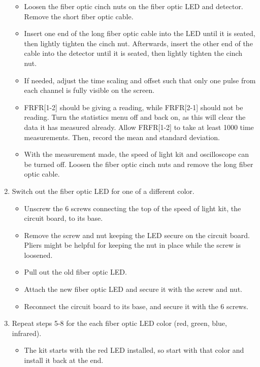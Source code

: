 \documentclass[12pt]{iopart} %
\begin{document}
\begin{enumerate}
  \begin{itemize}
  \item
    Loosen the fiber optic cinch nuts on the fiber optic LED and
    detector. Remove the short fiber optic cable.
  \item
    Insert one end of the long fiber optic cable into the LED until it
    is seated, then lightly tighten the cinch nut. Afterwards, insert
    the other end of the cable into the detector until it is seated,
    then lightly tighten the cinch nut.
  \item
    If needed, adjust the time scaling and offset such that only one
    pulse from each channel is fully visible on the screen.
  \item
    FRFR{[}1-2{]} should be giving a reading, while FRFR{[}2-1{]} should
    not be reading. Turn the statistics menu off and back on, as this
    will clear the data it has measured already. Allow FRFR{[}1-2{]} to
    take at least 1000 time measurements. Then, record the mean and
    standard deviation.
  \item
    With the measurement made, the speed of light kit and oscilloscope
    can be turned off. Loosen the fiber optic cinch nuts and remove the
    long fiber optic cable.
  \end{itemize}
\item
  Switch out the fiber optic LED for one of a different color.

  \begin{itemize}
  \item
    Unscrew the 6 screws connecting the top of the speed of light kit,
    the circuit board, to its base.
  \item
    Remove the screw and nut keeping the LED secure on the circuit
    board. Pliers might be helpful for keeping the nut in place while
    the screw is loosened.
  \item
    Pull out the old fiber optic LED.
  \item
    Attach the new fiber optic LED and secure it with the screw and nut.
  \item
    Reconnect the circuit board to its base, and secure it with the 6
    screws.
  \end{itemize}
\item
  Repeat steps 5-8 for the each fiber optic LED color (red, green,
  blue, infrared).

  \begin{itemize}
  \item
    The kit starts with the red LED installed, so start with that color
    and install it back at the end.
  \end{itemize}
\end{enumerate}
\end{document}
